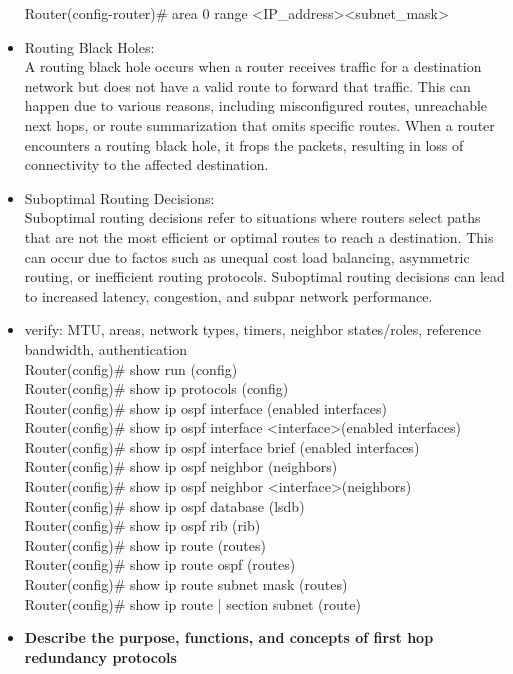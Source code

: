 \documentclass{article}
\begin{document}
\begin{itemize}
  		Router(config-router)\# area 0 range \textless IP\_address\textgreater \textless subnet\_mask\textgreater
  	\item[] Routing Black Holes:\\
  		A routing black hole occurs when a router receives traffic for a destination network but does not have a valid route to forward that traffic. This can happen due to various reasons, including misconfigured routes, unreachable next hops, or route summarization that omits specific routes. When a router encounters a routing black hole, it frops the packets, resulting in loss of connectivity to the affected destination.
  	\item[] Suboptimal Routing Decisions:\\
  		Suboptimal routing decisions refer to situations where routers select paths that are not the most efficient or optimal routes to reach a destination. This can occur due to factos such as unequal cost load balancing, asymmetric routing, or inefficient routing protocols. Suboptimal routing decisions can lead to increased latency, congestion, and subpar network performance.
  		
  	\item[] verify: MTU, areas, network types, timers, neighbor states/roles, reference bandwidth, authentication\\
  		Router(config)\# show run (config)\\
  		Router(config)\# show ip protocols (config)\\
  		
  		Router(config)\# show ip ospf interface (enabled interfaces)\\
  		Router(config)\# show ip ospf interface \textless interface\textgreater (enabled interfaces)\\
  		Router(config)\# show ip ospf interface brief (enabled interfaces)\\
  		
  		Router(config)\# show ip ospf neighbor (neighbors)\\
  		Router(config)\# show ip ospf neighbor \textless interface\textgreater (neighbors)\\
  		
  		Router(config)\# show ip ospf database (lsdb)\\
  		
  		Router(config)\# show ip ospf rib (rib)\\
  		
  		Router(config)\# show ip route (routes)\\
  		Router(config)\# show ip route ospf (routes)\\
  		Router(config)\# show ip route subnet mask (routes)\\
  		Router(config)\# show ip route | section subnet (route)
  
  \item \textbf{Describe the purpose, functions, and concepts of first hop redundancy protocols}\\
\end{itemize}
\end{document}
